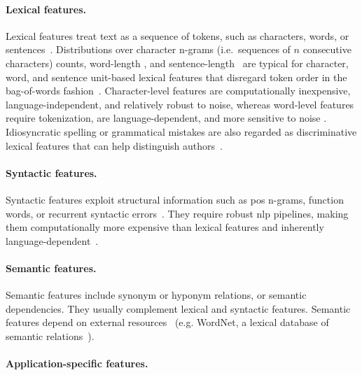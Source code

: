 \paragraph{Lexical features.} 
Lexical features treat text as a sequence of tokens, such as characters, words, or sentences~\citep{stamatatos_survey_2009}.
Distributions over character n-grams (i.e.\ sequences of $n$ consecutive characters) counts, word-length \citep{stein_intrinsic_2011}, and sentence-length~\citep{stein_intrinsic_2011,abbasi_writeprints_2008} are typical for character, word, and sentence unit-based lexical features that disregard token order in the bag-of-words fashion~\citep{neal_surveying_2018}. %
Character-level features are computationally inexpensive, language-independent, and relatively robust to noise, whereas word-level features require tokenization, are language-dependent, and more sensitive to noise \citep{stamatatos_survey_2009}.
Idiosyncratic spelling or grammatical mistakes are also regarded as discriminative lexical features that can help distinguish authors~\citep{abbasi_writeprints_2008,neal_surveying_2018}. 

\paragraph{Syntactic features.}
Syntactic features exploit structural information such as \ac{pos} n-grams, function words, or recurrent syntactic errors~\citep{stamatatos_survey_2009,abbasi_writeprints_2008}.
They require robust \ac{nlp} pipelines, making them computationally more expensive than lexical features and inherently language-dependent~\citep{neal_surveying_2018,stamatatos_survey_2009}.

\paragraph{Semantic features.}
Semantic features include synonym or hyponym relations, or semantic dependencies. 
They usually complement lexical and syntactic features. 
Semantic features depend on external resources~\citep{stamatatos_survey_2009} (e.g. WordNet, a lexical database of semantic relations~\citep{wordnet_1995}).


\paragraph{Application-specific features.} %

